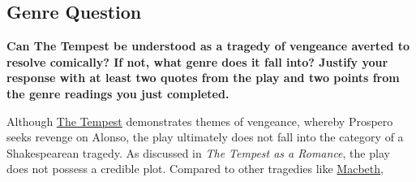 	\subsection{Genre Question}
		\textbf{Can The Tempest be understood as a tragedy of vengeance averted to resolve comically? If not, what genre does it fall into? Justify your response with at least two quotes from the play and two points from the genre readings you just completed.}

		Although \underline{The Tempest} demonstrates themes of vengeance, whereby Prospero seeks revenge on Alonso, the play ultimately does not fall into the category of a Shakespearean tragedy. As discussed in \textit{The Tempest as a Romance}, the play does not possess a credible plot. Compared to other tragedies like \underline{Macbeth},